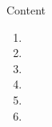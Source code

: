\begin{frame}{Content}
  \begin{enumerate}%
    \setlength\itemsep{1em}%
    \item<1-> \tci{} \tei{}
    \item<2-> \tcii{} \teii{}
    \item<3-> \tciii{} \teiii{}
    \item<4-> \tciv{} \teiv{}
    \item<5-> \tcv{} \tev{}
    \item<6-> \tcvi{} \tevi{}
  \end{enumerate}
\end{frame}

